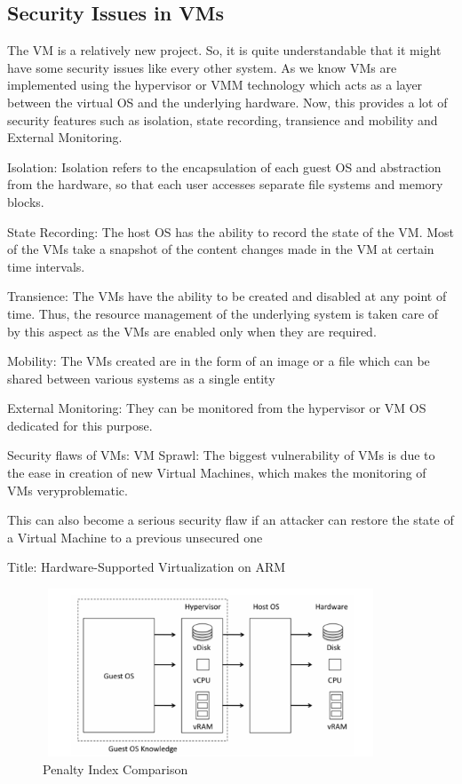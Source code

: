 \documentclass[runningheads]{llncs}
\begin{document}
%



\subsection{Security Issues in VMs} 
The VM is a relatively new project. So, it is quite understandable that it might have some security issues like every other system. As we know VMs are implemented using the hypervisor or VMM technology which acts as a layer between the virtual OS and the underlying hardware. Now, this provides a lot of security features such as isolation, state recording, transience and mobility and External Monitoring. 

Isolation: Isolation refers to the encapsulation of each guest OS and abstraction from the hardware, so that each user accesses separate file systems and memory blocks.

State Recording: The host OS has the ability to record the state of the VM. Most of the VMs take a snapshot of the content changes made in the VM at certain time intervals.

Transience: The VMs have the ability to be created and disabled at any point of time. Thus, the resource management of the underlying system is taken care of by this aspect as the VMs are enabled only when they are required.

Mobility: The VMs created are in the form of an image or a file which can be shared between various systems as a single entity

External Monitoring: They can be monitored from the hypervisor or VM OS dedicated for this purpose.

Security flaws of VMs:
VM Sprawl: The biggest vulnerability of VMs is due to the ease in creation of new Virtual Machines, which makes the monitoring of VMs veryproblematic.

This can also become a serious security flaw if an attacker can restore the state of a Virtual Machine to a previous unsecured one

Title: Hardware-Supported Virtualization on ARM
\begin{figure}[H]
 
      \centering
     \includegraphics[width=100mm,height=50mm]{guest_os_isolation.png}
     \caption{Penalty Index Comparison}
     \label{fig:galaxy}
  
 \end{figure}
\end{document}
